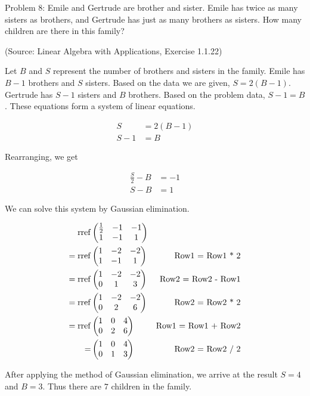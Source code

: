 Problem 8: Emile and Gertrude are brother and sister. Emile has twice as many sisters as brothers, and Gertrude has just as many brothers as sisters. How many children are there in this family?

(Source: Linear Algebra with Applications, Exercise 1.1.22)

Let $B$ and $S$ represent the number of brothers and sisters in the family. Emile has $B - 1$ brothers and $S$ sisters. Based on the data we are given, $S = 2(B-1)$. Gertrude has $S - 1$ sisters and $B$ brothers. Based on the problem data, $S - 1 = B$. These equations form a system of linear equations.

\begin{align*}
S &= 2 (B-1) \\
S - 1 &= B
\end{align*}

Rearranging, we get

\begin{align*}
\frac{S}{2} - B &= -1 \\
S - B &= 1
\end{align*}

We can solve this system by Gaussian elimination.

\begin{align*}
\mathop{\rm rref} & \begin{pmatrix}
\frac{1}{2} & -1 & -1 \\
1 & -1 & 1
\end{pmatrix} \\
= \mathop{\rm rref} & \begin{pmatrix}
1 & -2 & -2 \\
1 & -1 & 1
\end{pmatrix} & \text{Row1 = Row1 * 2} \\
= \mathop{\rm rref} & \begin{pmatrix}
1 & -2 & -2 \\
0 & 1 & 3
\end{pmatrix} & \text{Row2 = Row2 - Row1} \\
= \mathop{\rm rref} & \begin{pmatrix}
1 & -2 & -2 \\
0 & 2 & 6
\end{pmatrix} & \text{Row2 = Row2 * 2} \\
= \mathop{\rm rref} & \begin{pmatrix}
1 & 0 & 4 \\
0 & 2 & 6
\end{pmatrix} & \text{Row1 = Row1 + Row2} \\
= & \begin{pmatrix}
1 & 0 & 4 \\
0 & 1 & 3
\end{pmatrix} & \text{Row2 = Row2 / 2} \\
\end{align*}

After applying the method of Gaussian elimination, we arrive at the result $S = 4$ and $B = 3$. Thus there are $\boxed{7}$ children in the family.
